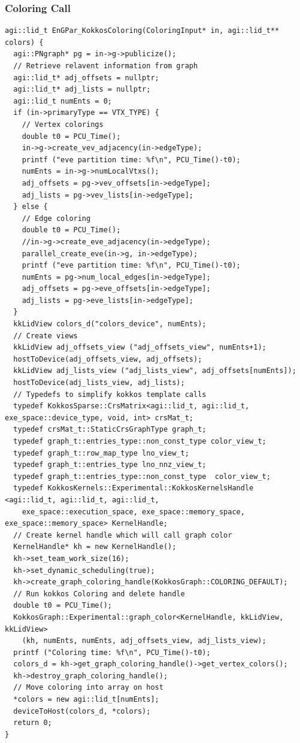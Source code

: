 \documentclass[graybox]{svmult}
\begin{document}
\subsubsection{Coloring Call}
\begin{verbatim}
agi::lid_t EnGPar_KokkosColoring(ColoringInput* in, agi::lid_t** colors) {
  agi::PNgraph* pg = in->g->publicize();
  // Retrieve relavent information from graph  
  agi::lid_t* adj_offsets = nullptr;
  agi::lid_t* adj_lists = nullptr;
  agi::lid_t numEnts = 0;
  if (in->primaryType == VTX_TYPE) {
    // Vertex colorings
    double t0 = PCU_Time();
    in->g->create_vev_adjacency(in->edgeType);
    printf ("eve partition time: %f\n", PCU_Time()-t0);
    numEnts = in->g->numLocalVtxs();
    adj_offsets = pg->vev_offsets[in->edgeType];
    adj_lists = pg->vev_lists[in->edgeType];
  } else {
    // Edge coloring
    double t0 = PCU_Time();
    //in->g->create_eve_adjacency(in->edgeType);
    parallel_create_eve(in->g, in->edgeType);
    printf ("eve partition time: %f\n", PCU_Time()-t0);
    numEnts = pg->num_local_edges[in->edgeType];
    adj_offsets = pg->eve_offsets[in->edgeType];
    adj_lists = pg->eve_lists[in->edgeType];
  }
  kkLidView colors_d("colors_device", numEnts);
  // Create views
  kkLidView adj_offsets_view ("adj_offsets_view", numEnts+1);
  hostToDevice(adj_offsets_view, adj_offsets);
  kkLidView adj_lists_view ("adj_lists_view", adj_offsets[numEnts]);
  hostToDevice(adj_lists_view, adj_lists);
  // Typedefs to simplify kokkos template calls 
  typedef KokkosSparse::CrsMatrix<agi::lid_t, agi::lid_t, exe_space::device_type, void, int> crsMat_t;
  typedef crsMat_t::StaticCrsGraphType graph_t;
  typedef graph_t::entries_type::non_const_type color_view_t;
  typedef graph_t::row_map_type lno_view_t;
  typedef graph_t::entries_type lno_nnz_view_t;
  typedef graph_t::entries_type::non_const_type  color_view_t;
  typedef KokkosKernels::Experimental::KokkosKernelsHandle <agi::lid_t, agi::lid_t, agi::lid_t,
    exe_space::execution_space, exe_space::memory_space, exe_space::memory_space> KernelHandle;
  // Create kernel handle which will call graph color
  KernelHandle* kh = new KernelHandle();
  kh->set_team_work_size(16);
  kh->set_dynamic_scheduling(true);
  kh->create_graph_coloring_handle(KokkosGraph::COLORING_DEFAULT);
  // Run kokkos Coloring and delete handle
  double t0 = PCU_Time();
  KokkosGraph::Experimental::graph_color<KernelHandle, kkLidView, kkLidView>
    (kh, numEnts, numEnts, adj_offsets_view, adj_lists_view);
  printf ("Coloring time: %f\n", PCU_Time()-t0);
  colors_d = kh->get_graph_coloring_handle()->get_vertex_colors();
  kh->destroy_graph_coloring_handle();
  // Move coloring into array on host 
  *colors = new agi::lid_t[numEnts];
  deviceToHost(colors_d, *colors);
  return 0;
}
\end{verbatim}
\end{document}
